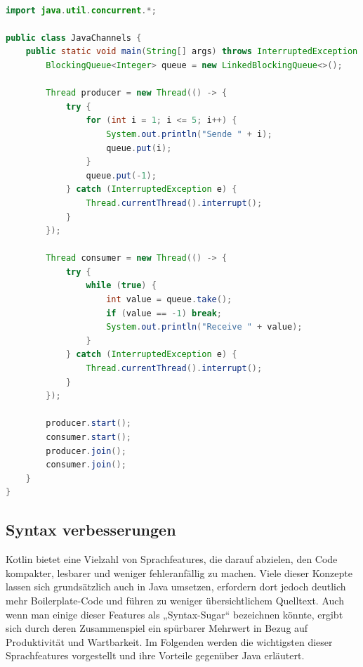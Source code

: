 \documentclass[11pt]{article}
\begin{document}
    \begin{lstlisting}[language=Java, caption={JavaChannels.java}, label={lst:java-channels}]

import java.util.concurrent.*;

public class JavaChannels {
    public static void main(String[] args) throws InterruptedException {
        BlockingQueue<Integer> queue = new LinkedBlockingQueue<>();

        Thread producer = new Thread(() -> {
            try {
                for (int i = 1; i <= 5; i++) {
                    System.out.println("Sende " + i);
                    queue.put(i);
                }
                queue.put(-1);
            } catch (InterruptedException e) {
                Thread.currentThread().interrupt();
            }
        });

        Thread consumer = new Thread(() -> {
            try {
                while (true) {
                    int value = queue.take();
                    if (value == -1) break;
                    System.out.println("Receive " + value);
                }
            } catch (InterruptedException e) {
                Thread.currentThread().interrupt();
            }
        });

        producer.start();
        consumer.start();
        producer.join();
        consumer.join();
    }
}
    \end{lstlisting}

    \subsection{Syntax verbesserungen}
    Kotlin bietet eine Vielzahl von Sprachfeatures, die darauf abzielen, den Code kompakter, lesbarer und weniger fehleranfällig zu machen.
    Viele dieser Konzepte lassen sich grundsätzlich auch in Java umsetzen, erfordern dort jedoch deutlich mehr Boilerplate-Code und führen zu weniger übersichtlichem Quelltext.
    Auch wenn man einige dieser Features als „Syntax-Sugar“ bezeichnen könnte, ergibt sich durch deren Zusammenspiel ein spürbarer Mehrwert in Bezug auf Produktivität und Wartbarkeit.
    Im Folgenden werden die wichtigsten dieser Sprachfeatures vorgestellt und ihre Vorteile gegenüber Java erläutert.
\end{document}
